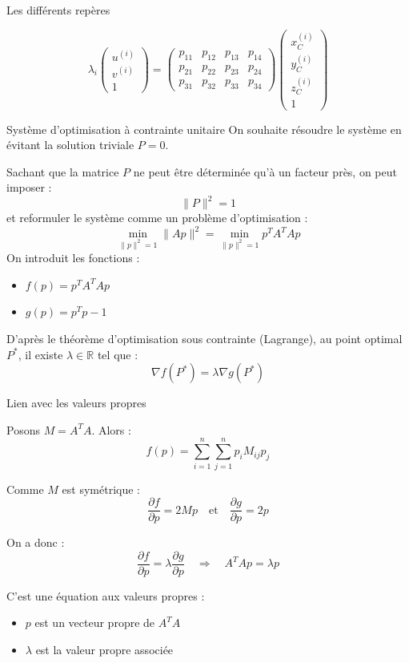 \begin{frame}[noframenumbering]{Les différents repères}

\[
\lambda_i 
\begin{pmatrix}
u^{(i)} \\
v^{(i)} \\
1
\end{pmatrix}
=
\begin{pmatrix}
p_{11} & p_{12} & p_{13} & p_{14} \\
p_{21} & p_{22} & p_{23} & p_{24} \\
p_{31} & p_{32} & p_{33} & p_{34}
\end{pmatrix}
\begin{pmatrix}
x_C^{(i)} \\
y_C^{(i)} \\
z_C^{(i)} \\
1
\end{pmatrix}
\]
\end{frame}

\begin{frame}[noframenumbering]{Système d’optimisation à contrainte unitaire}
\label{optimisation-appendix}
On souhaite résoudre le système en évitant la solution triviale \( P = 0 \).  
\pause

Sachant que la matrice \( P \) ne peut être déterminée qu’à un facteur près, on peut imposer :
\[
\|P\|^2 = 1
\]
et reformuler le système comme un problème d’optimisation :
\pause
\[
\min_{\|p\|^2 = 1} \|Ap\|^2 = \min_{\|p\|^2 = 1} p^T A^T A p
\]
\pause
On introduit les fonctions :
\begin{itemize}
  \item \( f(p) = p^T A^T A p \)
  \item \( g(p) = p^T p - 1 \)
\end{itemize}
\pause
D’après le théorème d’optimisation sous contrainte (Lagrange), au point optimal \( P^* \), il existe \( \lambda \in \mathbb{R} \) tel que :
\[
\nabla f(P^*) = \lambda \nabla g(P^*)
\]
\end{frame}



\begin{frame}[noframenumbering]{Lien avec les valeurs propres}

Posons \( M = A^T A \).  
Alors :
\[
f(p) = \sum_{i=1}^n \sum_{j=1}^n p_i M_{ij} p_j
\]
\pause

Comme \( M \) est symétrique :
\[
\frac{\partial f}{\partial p} = 2Mp
\quad \text{et} \quad
\frac{\partial g}{\partial p} = 2p
\]
\pause

On a donc :
\[
\frac{\partial f}{\partial p} = \lambda \frac{\partial g}{\partial p}
\quad \Rightarrow \quad
\boxed{A^T A p = \lambda p}
\]
\pause

C’est une équation aux valeurs propres :
\begin{itemize}
  \item \( p \) est un vecteur propre de \( A^T A \)
  \item \( \lambda \) est la valeur propre associée
\end{itemize}
\end{frame}

